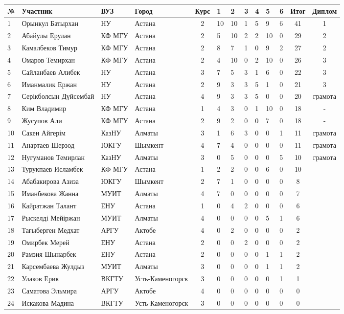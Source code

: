 \begin{tabular}{|l|l|l|p{2.2cm}|c|*{6}{p{0.3cm}|}c|c|}
\hline
№ & Участник & ВУЗ & Город & Курс & 1 & 2 & 3 & 4 & 5 & 6 & Итог & Диплом\\
\hline
1 & Орынкул Батырхан & НУ & Астана & 2 & 10 & 10 & 1 & 5 & 9 & 6 & 41 & 1\\
\hline
2 & Абайулы Ерулан & КФ МГУ  & Астана & 2 & 5 & 10 & 2 & 2 & 10 & 0 & 29 & 2\\
\hline
3 & Камалбеков Тимур & КФ МГУ  & Астана & 2 & 8 & 7 & 1 & 0 & 9 & 2 & 27 & 2\\
\hline
4 & Омаров Темирхан & КФ МГУ  & Астана & 2 & 4 & 10 & 0 & 2 & 10 & 0 & 26 & 3\\
\hline
5 & Сайланбаев Алибек & НУ  & Астана & 3 & 7 & 5 & 3 & 1 & 6 & 0 & 22 & 3\\
\hline
6 & Иманмалик Ержан & НУ  & Астана & 2 & 9 & 3 & 3 & 5 & 1 & 0 & 21 & 3\\
\hline
7 & Серікболсын Дүйсембай & НУ  & Астана & 4 & 9 & 3 & 3 & 5 & 0 & 0 & 20 & грамота\\
\hline
8 & Ким Владимир & КФ МГУ  & Астана & 1 & 4 & 3 & 0 & 1 & 10 & 0 & 18 & -\\
\hline
9 & Жусупов Али & КФ МГУ  & Астана & 2 & 9 & 2 & 0 & 0 & 7 & 0 & 18 & -\\
\hline
10 & Сакен Айгерім & КазНУ  & Алматы & 3 & 1 & 6 & 3 & 0 & 0 & 1 & 11 & грамота\\
\hline
11 & Анартаев Шерзод & ЮКГУ  & Шымкент & 4 & 7 & 4 & 0 & 0 & 0 & 0 & 11 & грамота\\
\hline
12 & Нугуманов Темирлан & КазНУ  & Алматы & 3 & 0 & 5 & 0 & 0 & 0 & 5 & 10 & грамота\\
\hline
13 & Турукпаев Исламбек & КФ МГУ  & Астана & 1 & 2 & 2 & 0 & 0 & 6 & 0 & 10 & \\
\hline
14 & Абабакирова Азиза & ЮКГУ  & Шымкент & 2 & 7 & 1 & 0 & 0 & 0 & 0 & 8 & \\
\hline
15 & Иманбекова Жанна & МУИТ  & Алматы & 4 & 7 & 0 & 0 & 0 & 0 & 0 & 7 & \\
\hline
16 & Кайратжан Талант & ЕНУ  & Астана & 1 & 0 & 4 & 2 & 0 & 0 & 0 & 6 & \\
\hline
17 & Рыскелді Мейіржан & МУИТ  & Алматы & 4 & 0 & 0 & 0 & 0 & 5 & 1 & 6 & \\
\hline
18 & Тағыберген Медхат & АРГУ  & Актобе & 4 & 0 & 2 & 0 & 0 & 0 & 0 & 2 & \\
\hline
19 & Омирбек Мерей & ЕНУ  & Астана & 2 & 0 & 0 & 2 & 0 & 0 & 0 & 2 & \\
\hline
20 & Рамзия Шынарбек & ЕНУ  & Астана & 2 & 0 & 0 & 0 & 0 & 1 & 1 & 2 & \\
\hline
21 & Карсембаева Жулдыз & МУИТ  & Алматы & 3 & 0 & 0 & 0 & 0 & 1 & 1 & 2 & \\
\hline
22 & Улаков Ерик & ВКГТУ  &  Усть-Каменогорск & 3 & 0 & 0 & 0 & 0 & 0 & 1 & 1 & \\
\hline
23 & Саматова Эльмира & АРГУ  & Актобе & 4 & 0 & 0 & 0 & 0 & 0 & 0 & 0 & \\
\hline
24 & Искакова Мадина & ВКГТУ  & Усть-Каменогорск & 3 & 0 & 0 & 0 & 0 & 0 & 0 & 0 & \\
\hline
\end{tabular}
